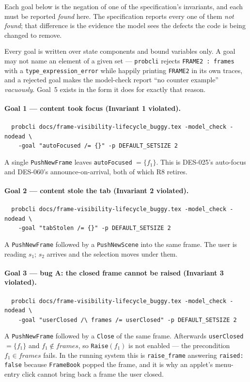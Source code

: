 \documentclass[a4paper,10pt,fleqn]{article}
\begin{document}
Each goal below is the negation of one of the specification's invariants, and
each must be reported \emph{found} here.  The specification reports every one
of them \emph{not found}; that difference is the evidence the model sees the
defects the code is being changed to remove.

Every goal is written over state components and bound variables only.  A goal
may not name an element of a given set --- \texttt{probcli} rejects
\texttt{FRAME2 : frames} with a \texttt{type\_expression\_error} while
happily printing \texttt{FRAME2} in its own traces, and a rejected goal makes
the model-check report ``no counter example'' \emph{vacuously}.  Goal~5 exists
in the form it does for exactly that reason.

\paragraph{Goal 1 --- content took focus (Invariant 1 violated).}
\begin{verbatim}
  probcli docs/frame-visibility-lifecycle_buggy.tex -model_check -nodead \
    -goal "autoFocused /= {}" -p DEFAULT_SETSIZE 2
\end{verbatim}
A single \texttt{PushNewFrame} leaves \texttt{autoFocused} $= \{f_1\}$.
This is DES-025's auto-focus and DES-060's announce-on-arrival, both of which
R8 retires.

\paragraph{Goal 2 --- content stole the tab (Invariant 2 violated).}
\begin{verbatim}
  probcli docs/frame-visibility-lifecycle_buggy.tex -model_check -nodead \
    -goal "tabStolen /= {}" -p DEFAULT_SETSIZE 2
\end{verbatim}
A \texttt{PushNewFrame} followed by a \texttt{PushNewScene} into the same
frame.  The user is reading $s_1$; $s_2$ arrives and the selection moves under
them.

\paragraph{Goal 3 --- bug A: the closed frame cannot be raised (Invariant 3
violated).}
\begin{verbatim}
  probcli docs/frame-visibility-lifecycle_buggy.tex -model_check -nodead \
    -goal "userClosed /\ frames /= userClosed" -p DEFAULT_SETSIZE 2
\end{verbatim}
A \texttt{PushNewFrame} followed by a \texttt{Close} of the same frame.
Afterwards \texttt{userClosed} $= \{f_1\}$ and $f_1 \notin frames$, so
\texttt{Raise}$(f_1)$ is not enabled --- the precondition $f_1 \in frames$
fails.  In the running system this is \texttt{raise\_frame} answering
\texttt{raised: false} because \texttt{FrameBook} popped the frame, and it is
why an applet's menu-entry click cannot bring back a frame the user closed.
\end{document}
